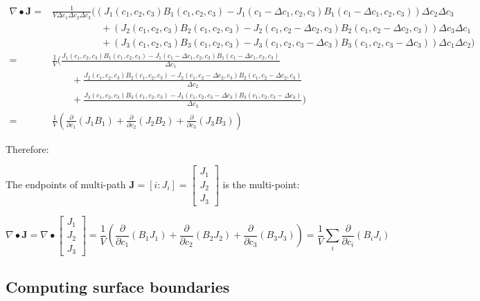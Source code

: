 \begin{align*}
\nabla \bullet \mathbf{J} = & \frac{1}{V \Delta c_1 \Delta c_2 \Delta c_3}\bigg((J_1(c_1,c_2,c_3) B_1(c_1, c_2, c_3) - J_1(c_1 - \Delta c_1,c_2,c_3) B_1(c_1 - \Delta c_1, c_2, c_3))\Delta c_2 \Delta c_3 \\
& \quad\quad\quad\quad\quad + (J_2(c_1,c_2,c_3) B_2(c_1, c_2, c_3) - J_2(c_1,c_2 - \Delta c_2,c_3) B_2(c_1, c_2 - \Delta c_2, c_3)) \Delta c_3 \Delta c_1 \\ 
& \quad\quad\quad\quad\quad + (J_3(c_1,c_2,c_3) B_3(c_1, c_2, c_3) - J_3(c_1,c_2,c_3 - \Delta c_3) B_3(c_1, c_2, c_3 - \Delta c_3)) \Delta c_1 \Delta c_2 \bigg) \\
= & \frac{1}{V}\bigg(\frac{J_1(c_1,c_2,c_3) B_1(c_1, c_2, c_3) - J_1(c_1 - \Delta c_1,c_2,c_3) B_1(c_1 - \Delta c_1, c_2, c_3)}{\Delta c_1} \\
& \quad\quad + \frac{J_2(c_1,c_2,c_3) B_2(c_1, c_2, c_3) - J_2(c_1,c_2 - \Delta c_2,c_3) B_2(c_1, c_2 - \Delta c_2, c_3)}{\Delta c_2} \\ 
& \quad\quad + \frac{J_3(c_1,c_2,c_3) B_3(c_1, c_2, c_3) - J_3(c_1,c_2,c_3 - \Delta c_3) B_3(c_1, c_2, c_3 - \Delta c_3)}{\Delta c_3}\bigg) \\
= & \frac{1}{V}\left(\frac{\partial}{\partial c_1}(J_1 B_1) + \frac{\partial}{\partial c_2}(J_2 B_2) + \frac{\partial}{\partial c_3}(J_3 B_3)\right)
\end{align*}

Therefore:
\begin{thm}
The endpoints of multi-path \(\mathbf{J} = [i : J_i] = \begin{bmatrix} J_1 \\ J_2 \\ J_3 \end{bmatrix}\) is the multi-point:

\[\nabla \bullet \mathbf{J} = \nabla \bullet \begin{bmatrix} J_1 \\ J_2 \\ J_3 \end{bmatrix} = \frac{1}{V}\left(\frac{\partial}{\partial c_1}(B_1 J_1) + \frac{\partial}{\partial c_2}(B_2 J_2) + \frac{\partial}{\partial c_3}(B_3 J_3)\right) = \frac{1}{V}\sum_i \frac{\partial}{\partial c_i} (B_i J_i)\]
\end{thm}



\subsection{Computing surface boundaries}

